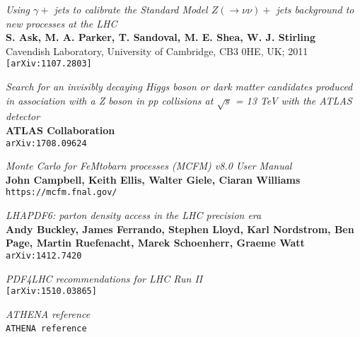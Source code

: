 \documentclass[11pt,a4paper,final]{report}
\begin{document}
\begin{thebibliography}{9}
	\textit{Using $\gamma +$ jets to calibrate the Standard Model $Z(\rightarrow \nu\nu)+$ jets background to new processes at the LHC}\\
	\textbf{S. Ask, M. A. Parker, T. Sandoval, M. E. Shea, W. J. Stirling}\\
Cavendish Laboratory, University of Cambridge, CB3 0HE, UK; 2011\\
	\texttt{[arXiv:1107.2803]}
	
	\textit{Search for an invisibly decaying Higgs boson or dark matter candidates produced in association with a Z boson in pp collisions at $\sqrt{s}$ = 13 TeV with the ATLAS detector}\\
	\textbf{ATLAS Collaboration}\\
	\texttt{arXiv:1708.09624}

	\textit{Monte Carlo for FeMtobarn processes (MCFM) v8.0 User Manual}\\
	\textbf{John Campbell, Keith Ellis, Walter Giele, Ciaran Williams}\\
	\texttt{https://mcfm.fnal.gov/}
	
	\textit{LHAPDF6: parton density access in the LHC precision era}\\
	\textbf{Andy Buckley, James Ferrando, Stephen Lloyd, Karl Nordstrom, Ben Page, Martin Ruefenacht, Marek Schoenherr, Graeme Watt}\\
	\texttt{arXiv:1412.7420}
	
	\textit{PDF4LHC recommendations for LHC Run II}\\
	\texttt{[arXiv:1510.03865]}

	\textit{ATHENA reference}\\
	\texttt{ATHENA reference}
	\
\end{thebibliography}
\end{document}
